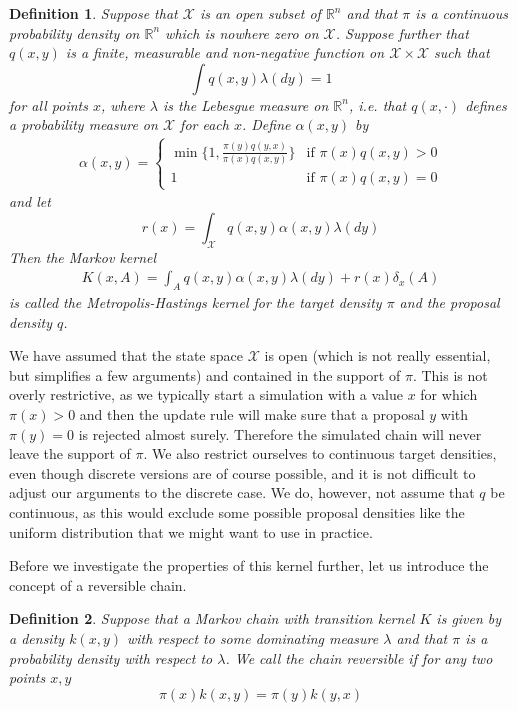 \documentclass[a4paper, draft]{article}
\theoremstyle{own}
\newtheorem{defn}{Definition}[section]
\theoremstyle{remark}
\newcommand{\R}{\mathbb{R}}
\begin{document}
\begin{defn}
	Suppose that ${\mathcal X}$ is an open subset of $\R^n$ and that $\pi$ is a continuous probability density on $\R^n$ which is nowhere zero on ${\mathcal X}$. Suppose further that $q(x,y)$ is a finite, measurable and non-negative function on ${\mathcal X} \times {\mathcal X}$ such that
	$$
	\int q(x,y) \lambda(dy) = 1
	$$
	for all points $x$, where $\lambda$ is the Lebesgue measure on $\R^n$, i.e. that $q(x,\cdot)$ defines a probability measure on ${\mathcal X}$ for each $x$. 
	Define $\alpha(x,y)$ by
	\begin{align}\label{eq:metropolishastingsacceptanceprobability}
	\alpha(x,y) = 
	\begin{cases}
	\min \{ 1, \frac{\pi(y)q(y,x)}{\pi(x)q(x,y)} \} & \text{if } \pi(x) q(x,y) > 0 \\
	1 & \text{if } \pi(x) q(x,y) = 0 
	\end{cases}
	\end{align}
	and let
	$$
	r(x) = \int_{\mathcal X} q(x,y) \alpha(x,y) \lambda(dy)
	$$
	Then the Markov kernel 
	\begin{align}\label{eq:metropolishastingskernel}
	K(x,A) = \int_A q(x,y) \alpha(x,y) \lambda(dy) + r(x) \delta_x(A)
	\end{align}
	is called the {\em Metropolis-Hastings kernel} for the {\em target density} $\pi$ and the {\em proposal density} $q$. 
\end{defn}

We have assumed that the state space ${\mathcal X}$ is open (which is not really essential, but simplifies a few arguments) and contained in the support of $\pi$. This is not overly restrictive, as we typically start a simulation with a value $x$ for which $\pi(x) > 0$ and then the update rule will make sure that a proposal $y$ with $\pi(y) = 0$ is rejected almost surely. Therefore the simulated chain will never leave the support of $\pi$. We also restrict ourselves to continuous target densities, even though discrete versions are of course possible, and it is not difficult to adjust our arguments to the discrete case. We do, however, not assume that $q$ be continuous, as this would exclude some possible proposal densities like the uniform distribution that we might want to use in practice.

Before we investigate the properties of this kernel further, let us introduce the concept of a reversible chain.

\begin{defn}
	Suppose that a Markov chain with transition kernel $K$ is given by a density $k(x,y)$ with respect to some dominating measure $\lambda$ and that $\pi$ is a probability density with respect to $\lambda$. We call the chain {\em reversible} if for any two points $x, y$
	$$
	\pi(x) k(x,y) = \pi(y) k(y,x)
	$$
\end{defn}
\end{document}
